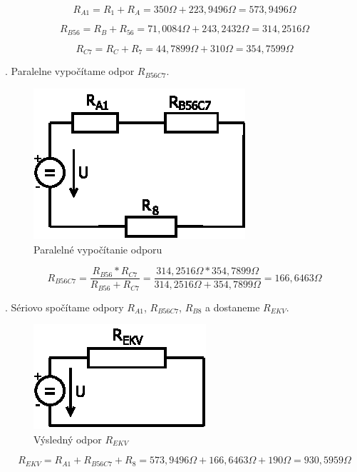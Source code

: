 \documentclass[a4paper,12pt]{article}
\begin{document}
\begin{equation}
R_{A1} = R_1 + R_A =350\Omega + 223,9496\Omega = 573,9496\Omega
\end{equation}

\begin{equation}
R_{B56} = R_B + R_{56} =71,0084\Omega + 243,2432\Omega = 314,2516\Omega
\end{equation}

\begin{equation}
R_{C7} = R_C + R_7 =44,7899\Omega +310\Omega = 354,7599\Omega
\end{equation}

. Paralelne vypočítame odpor $R_{B56C7}$.
\begin{figure}[!htb]
\centering
\includegraphics[scale=1.5]{p1/p5.eps}
\caption{Paralelné vypočítanie odporu}
\end{figure}

\begin{equation}
R_{B56C7} = \frac{R_{B56} * R_{C7}}{ R_{B56} + R_{C7}} = \frac{314,2516\Omega*354,7899\Omega}{314,2516\Omega+354,7899\Omega} = 166,6463\Omega
\end{equation}

. Sériovo spočítame odpory $R_{A1}$, $R_{B56C7}$, $R_{B8}$ a dostaneme $R_{EKV}$.
\begin{figure}[!htb]
\centering
\includegraphics[scale=1.5]{p1/p6.eps}
\caption{Výsledný odpor $R_{EKV}$}
\end{figure}

\begin{equation}
R_{EKV} = R_{A1} + R_{B56C7} + R_8=573,9496\Omega + 166,6463\Omega + 190\Omega = 930,5959\Omega
\end{equation}
\end{document}
